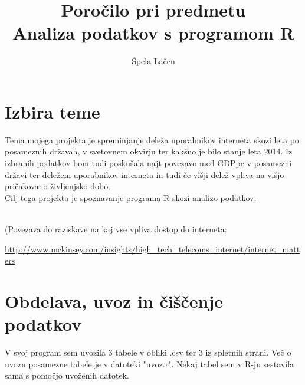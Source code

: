 \documentclass[11pt,a4paper]{article}
\begin{document}
\title{Poročilo pri predmetu \\
Analiza podatkov s programom R}
\author{Špela Lačen}
\maketitle

\section{Izbira teme}

Tema mojega projekta je spreminjanje deleža uporabnikov interneta skozi leta po posameznih državah, v svetovnem okvirju ter kakšno je bilo stanje leta 2014. Iz izbranih podatkov bom tudi poskušala najt povezavo med  GDPpc v posamezni državi ter deležem uporabnikov interneta in tudi če višji delež  vpliva na višjo pričakovano življenjsko dobo.
\\ Cilj tega projekta je spoznavanje programa R skozi analizo podatkov.

\\ (Povezava do raziskave na kaj vse vpliva dostop do interneta: \item \url{http://www.mckinsey.com/insights/high_tech_telecoms_internet/internet_matters}

\newpage

\section{Obdelava, uvoz in čiščenje podatkov}
V svoj program sem uvozila 3 tabele  v obliki .csv ter 3 iz spletnih strani. Več o uvozu posamezne tabele je v datoteki "uvoz.r".
Nekaj tabel sem v R-ju sestavila sama s pomočjo uvoženih datotek.
\end{document}
